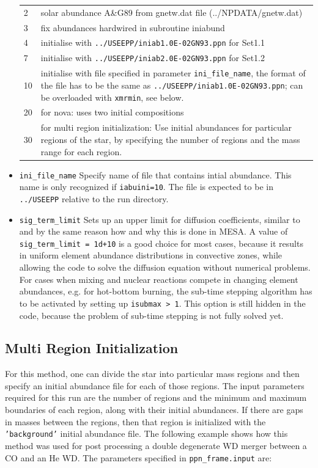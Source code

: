\begin{itemize}
\begin{tabularx}{0.9\textwidth}{lX}
2 & solar abundance A\&G89 from gnetw.dat file (../NPDATA/gnetw.dat) \\
3 & fix abundances hardwired in subroutine iniabund  \\
4 & initialise with \texttt{../USEEPP/iniab1.0E-02GN93.ppn} for Set1.1\\
7 & initialise with \texttt{../USEEPP/iniab2.0E-02GN93.ppn} for Set1.2\\
10 & initialise with file specified in parameter \texttt{ini\_file\_name}, the format of the file has to be the same as  \texttt{../USEEPP/iniab1.0E-02GN93.ppn}; can be overloaded with \texttt{xmrmin}, see below. \\
20 & for nova: uses two initial compositions\\
30 & for multi region initialization: Use initial abundances for particular regions of the star, by specifying the number of regions and the mass range for each region.

\end{tabularx}
\item {}\texttt{ini\_file\_name} Specify name of file
  that contains intial abundance. This name is only recognized if
  \texttt{iabuini=10}. The file is expected to be in
  \texttt{../USEEPP} relative to the run directory.
\item {}\texttt{sig\_term\_limit} Sets up an upper limit for diffusion coefficients, similar to and 
by the same reason how and why this is done
 in MESA. A value of \texttt{sig\_term\_limit = 1d+10} is a good choice for most cases, because it results in uniform element
abundance distributions in convective zones, while allowing the code to solve the diffusion equation without numerical problems.
For cases when mixing and nuclear reactions compete in changing element abundances, e.g. for hot-bottom burning,
the sub-time stepping algorithm has to be activated by setting up \texttt{isubmax > 1}. This option is still hidden in the code, 
because the problem of sub-time stepping is not fully solved yet.
\end{itemize}

\subsection{Multi Region Initialization}

For this method, one can divide the star into particular mass regions and then specify an initial abundance file for each of those regions. The input parameters required for this run are the number of regions and the minimum and maximum boundaries of each region, along with their initial abundances. If there are gaps in masses between the regions, then that region is initialized with the \texttt{'background'} initial abundance file. The following example shows how this method was used for post processing a double degenerate WD merger between a CO and an He WD. The parameters specified in \texttt{ppn\_frame.input} are:

